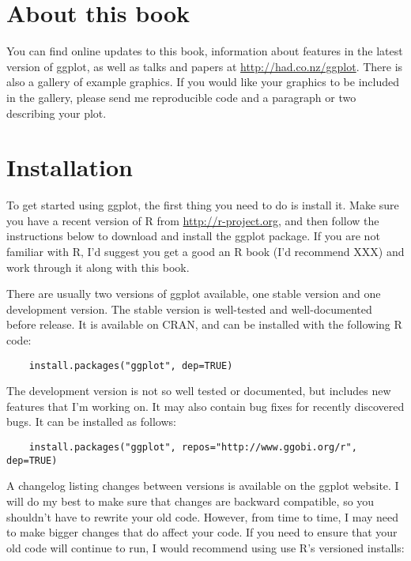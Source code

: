 \section{About this book}\label{sec:about_this_book}


You can find online updates to this book, information about features in the latest version of ggplot, as well as talks and papers at \url{http://had.co.nz/ggplot}.  There is also a gallery of example graphics.  If you would like your graphics to be included in the gallery, please send me reproducible code and a paragraph or two describing your plot.

\section{Installation}\label{sub:installation}

To get started using ggplot, the first thing you need to do is install it.  Make sure you have a recent version of R from \url{http://r-project.org}, and then follow the instructions below to download and install the ggplot package.  If you are not familiar with R, I'd suggest you get a good an R book (I'd recommend XXX) and work through it along with this book.

There are usually two versions of ggplot available, one stable version and one development version. The stable version is well-tested and well-documented before release.  It is available on CRAN, and can be installed with the following R code:

\begin{verbatim}
	install.packages("ggplot", dep=TRUE)
\end{verbatim}

The development version is not so well tested or documented, but includes new features that I'm working on.  It may also contain bug fixes for recently discovered bugs.  It can be installed as follows:

\begin{verbatim}
	install.packages("ggplot", repos="http://www.ggobi.org/r", dep=TRUE)
\end{verbatim}

A changelog listing changes between versions is available on the ggplot website.  I will do my best to make sure that changes are backward compatible, so you shouldn't have to rewrite your old code.  However, from time to time, I may need to make bigger changes that do affect your code.  If you need to ensure that your old code will continue to run, I would recommend using use R's versioned installs:

